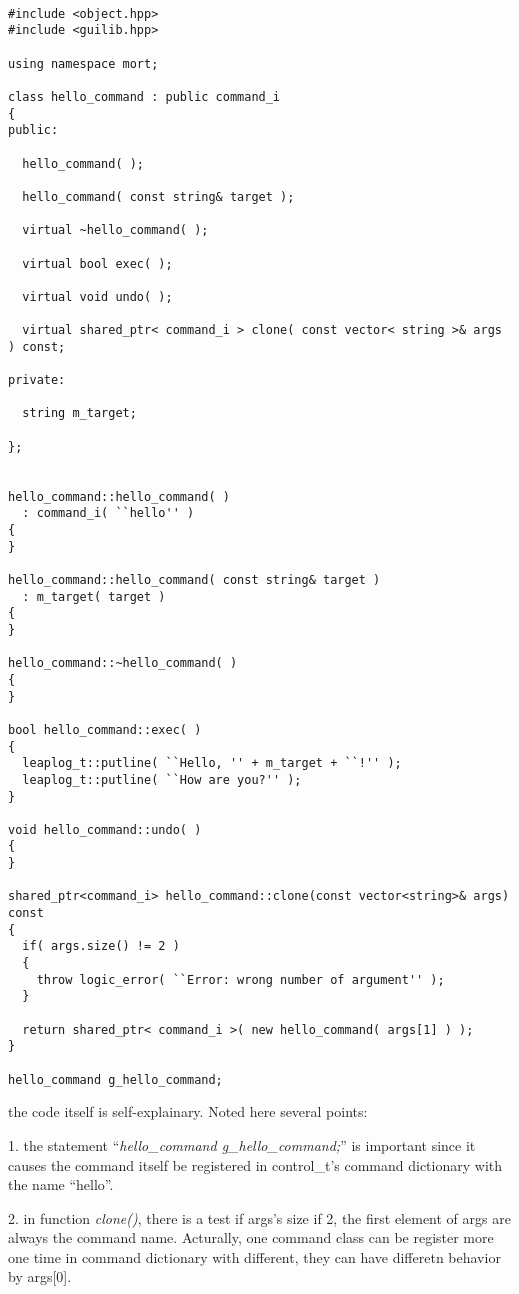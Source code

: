 \documentclass[letterpaper]{book}
\begin{document}
\begin{lstlisting}

#include <object.hpp>
#include <guilib.hpp>

using namespace mort;

class hello_command : public command_i
{
public:

  hello_command( );

  hello_command( const string& target );
    
  virtual ~hello_command( );
    
  virtual bool exec( );
    
  virtual void undo( );
    
  virtual shared_ptr< command_i > clone( const vector< string >& args ) const;
    
private:

  string m_target;
    
};
    

hello_command::hello_command( )
  : command_i( ``hello'' )
{
}

hello_command::hello_command( const string& target )
  : m_target( target )
{
}

hello_command::~hello_command( )
{
}

bool hello_command::exec( )
{
  leaplog_t::putline( ``Hello, '' + m_target + ``!'' );
  leaplog_t::putline( ``How are you?'' );
}

void hello_command::undo( )
{
}

shared_ptr<command_i> hello_command::clone(const vector<string>& args) const
{
  if( args.size() != 2 )
  {
    throw logic_error( ``Error: wrong number of argument'' );
  }

  return shared_ptr< command_i >( new hello_command( args[1] ) );
}

hello_command g_hello_command;

\end{lstlisting}

the code itself is self-explainary. Noted here several points:


1. the statement ``{\it hello\_command g\_hello\_command;}'' is important since it 
causes the command itself be registered in control\_t's command dictionary with the 
name ``hello''. 


2. in function {\it clone()}, there is a test if args's size if 2, the first element
of args are always the command name. Acturally, one command class can be register 
more one time in command dictionary with different, they can have differetn behavior
by args[0]. 
\end{document}
